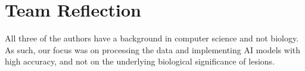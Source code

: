 \section*{Team Reflection}
All three of the authors have a background in computer science and not biology. As such, our focus was on processing the data and implementing AI models with high accuracy, and not on the underlying biological significance of lesions.




\vfill


%
%



%
%


